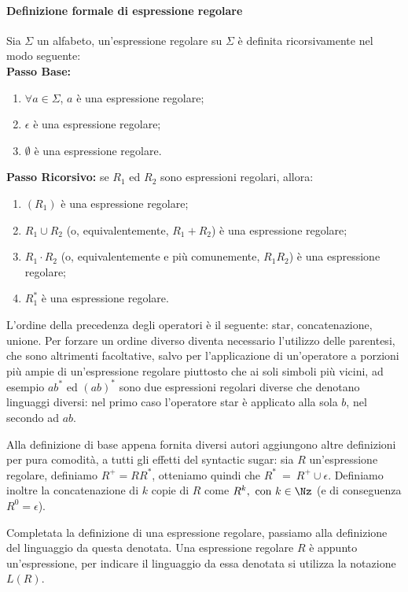 \paragraph{Definizione formale di espressione regolare}
\begin{definizione}
	Sia $\Sigma$ un alfabeto, un'espressione regolare su $\Sigma$ è definita ricorsivamente nel modo seguente:\\
	\textbf{Passo Base:}
	\begin{enumerate}
		\item $\forall a \in \Sigma$,  $a$ è una espressione regolare;
		\item $\epsilon$ è una espressione regolare;
		\item $\emptyset$ è una espressione regolare.
	\end{enumerate}
	\textbf{Passo Ricorsivo:} se $R_1$ ed $R_2$ sono espressioni regolari, allora:
	\begin{enumerate}
		\item $(R_1)$ è una espressione regolare;
		\item $R_1 \cup R_2$ (o, equivalentemente, $R_1 + R_2$) è una espressione regolare;
		\item $R_1 \cdot R_2$ (o, equivalentemente e più comunemente, $R_1R_2$) è una espressione regolare;
		\item $R_1^*$ è una espressione regolare.
	\end{enumerate}
\end{definizione}

L'ordine della precedenza degli operatori è il seguente: star, concatenazione, unione. Per forzare un ordine diverso diventa necessario l'utilizzo delle parentesi, che sono altrimenti facoltative, salvo per l'applicazione di un'operatore a porzioni più ampie di un'espressione regolare piuttosto che ai soli simboli più vicini, ad esempio $ab^*$ ed $(ab)^*$ sono due espressioni regolari diverse che denotano linguaggi diversi: nel primo caso l'operatore star è applicato alla sola $b$, nel secondo ad $ab$.

Alla definizione di base appena fornita diversi autori aggiungono altre definizioni per pura comodità, a tutti gli effetti del syntactic sugar: sia $R$ un'espressione regolare, definiamo $R^+ = RR^*$, otteniamo quindi che $R^*~=~R^+ \cup \epsilon$. Definiamo inoltre la concatenazione di $k$ copie di $R$ come $R^k, \text{ con } k \in \Nz$ (e di conseguenza $R^0 = \epsilon$).

Completata la definizione di una espressione regolare, passiamo alla definizione del linguaggio da questa denotata. Una espressione regolare $R$ è appunto un'espressione, per indicare il linguaggio da essa denotata si utilizza la notazione $L(R)$.

